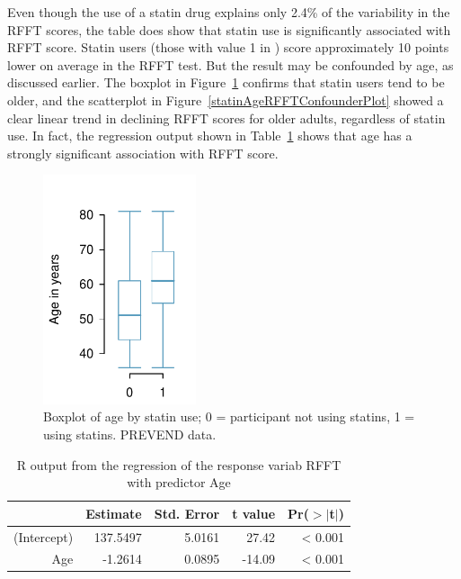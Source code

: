 Even though the use of a statin drug explains only 2.4\% of the variability in the RFFT scores, the table does show that statin use is significantly associated with RFFT score. Statin users (those with value 1 in ) score approximately 10 points lower on average in the RFFT test.  But the result may be confounded by age, as discussed earlier.   The boxplot in Figure~\ref{statinAgeBoxPlot} confirms that statin users tend to be older, and the scatterplot in Figure~\ref{statinAgeRFFTConfounderPlot} showed a clear linear trend in declining RFFT scores for older adults, regardless of statin use.  In fact, the regression output shown in Table~\ref{RFFTAgeRegression} shows that age has a strongly significant association with RFFT score.
 
 \begin{figure}[h!]
 	\centering
 	\includegraphics[width=0.4\textwidth]
	{ch_multiple_linear_regression_oi_biostat/figures/statinAgeBoxPlot/statinAgeBoxPlot.pdf}
 	\caption{Boxplot of age by statin use; 0 = participant not using statins, 1 = using statins. PREVEND data.}
	\label{statinAgeBoxPlot}
 \end{figure}
 
\begin{table}[ht]
\centering
\begin{tabular}{rrrrr}
  \hline
 & Estimate & Std. Error & t value & Pr($>$$|$t$|$) \\ 
  \hline
(Intercept) & 137.5497 & 5.0161 & 27.42 & < 0.001 \\ 
  Age & -1.2614 & 0.0895 & -14.09 & < 0.001 \\ 
   \hline
\end{tabular}
\caption{R output from the regression of the 
       response variab RFFT with predictor Age} 
\label{RFFTAgeRegression}
\end{table}


